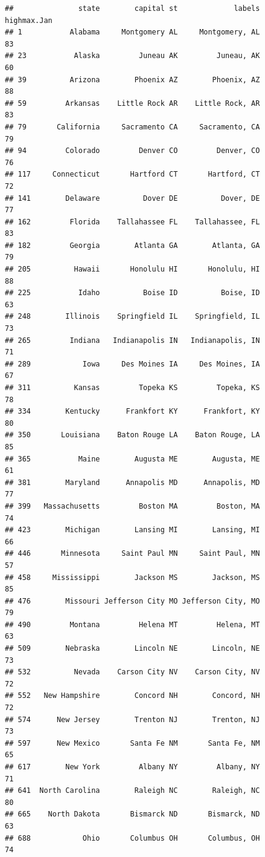\documentclass[
]{article}
\begin{document}
\begin{verbatim}
##               state        capital st             labels highmax.Jan
## 1           Alabama     Montgomery AL     Montgomery, AL          83
## 23           Alaska         Juneau AK         Juneau, AK          60
## 39          Arizona        Phoenix AZ        Phoenix, AZ          88
## 59         Arkansas    Little Rock AR    Little Rock, AR          83
## 79       California     Sacramento CA     Sacramento, CA          79
## 94         Colorado         Denver CO         Denver, CO          76
## 117     Connecticut       Hartford CT       Hartford, CT          72
## 141        Delaware          Dover DE          Dover, DE          77
## 162         Florida    Tallahassee FL    Tallahassee, FL          83
## 182         Georgia        Atlanta GA        Atlanta, GA          79
## 205          Hawaii       Honolulu HI       Honolulu, HI          88
## 225           Idaho          Boise ID          Boise, ID          63
## 248        Illinois    Springfield IL    Springfield, IL          73
## 265         Indiana   Indianapolis IN   Indianapolis, IN          71
## 289            Iowa     Des Moines IA     Des Moines, IA          67
## 311          Kansas         Topeka KS         Topeka, KS          78
## 334        Kentucky      Frankfort KY      Frankfort, KY          80
## 350       Louisiana    Baton Rouge LA    Baton Rouge, LA          85
## 365           Maine        Augusta ME        Augusta, ME          61
## 381        Maryland      Annapolis MD      Annapolis, MD          77
## 399   Massachusetts         Boston MA         Boston, MA          74
## 423        Michigan        Lansing MI        Lansing, MI          66
## 446       Minnesota     Saint Paul MN     Saint Paul, MN          57
## 458     Mississippi        Jackson MS        Jackson, MS          85
## 476        Missouri Jefferson City MO Jefferson City, MO          79
## 490         Montana         Helena MT         Helena, MT          63
## 509        Nebraska        Lincoln NE        Lincoln, NE          73
## 532          Nevada    Carson City NV    Carson City, NV          72
## 552   New Hampshire        Concord NH        Concord, NH          72
## 574      New Jersey        Trenton NJ        Trenton, NJ          73
## 597      New Mexico       Santa Fe NM       Santa Fe, NM          65
## 617        New York         Albany NY         Albany, NY          71
## 641  North Carolina        Raleigh NC        Raleigh, NC          80
## 665    North Dakota       Bismarck ND       Bismarck, ND          63
## 688            Ohio       Columbus OH       Columbus, OH          74

\end{verbatim}
\end{document}
